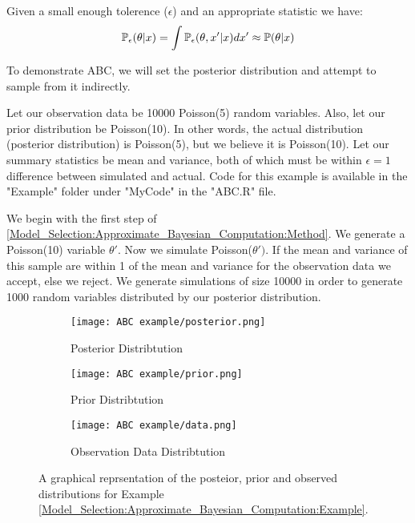 Given a small enough tolerence ($\epsilon$) and an appropriate statistic we have:
\begin{equation}
    \label{Model_Selection:Approximate_Bayesian_Computation:posterior_convergence}
    \mathbb{P}_{\epsilon}(\theta|x) = \int \mathbb{P}_{\epsilon}(\theta, x'|x)dx' \approx \mathbb{P}(\theta|x)
\end{equation}

\begin{example}
    \label{Model_Selection:Approximate_Bayesian_Computation:Example}
    To demonstrate ABC, we will set the posterior distribution and attempt to sample from it indirectly.

    Let our observation data be 10000 Poisson(5) random variables. Also, let our prior distribution be Poisson(10). In other words, the actual distribution (posterior distribution) is Poisson(5), but we believe it is Poisson(10). Let our summary statistics be mean and variance, both of which must be within $\epsilon =1$ difference between simulated and actual. Code for this example is available in the "Example" folder under "MyCode" in the "ABC.R" file.

    We begin with the first step of \ref{Model_Selection:Approximate_Bayesian_Computation:Method}. We generate a Poisson(10) variable $\theta'$. Now we simulate Poisson($\theta')$. If the mean and variance of this sample are within 1 of the mean and variance for the observation data we accept, else we reject. We generate simulations of size 10000 in order to generate 1000 random variables distributed by our posterior distribution. 

    \begin{figure}
        \centering
        \begin{subfigure}{.45\textwidth}
            \centering
            \texttt{[image: ABC example/posterior.png]}
            \caption{Posterior Distribtution}
            \label{Model_Selection:Approximate_Bayesian_Computation:Example_Figure:1}
        \end{subfigure}
        \begin{subfigure}{.45\textwidth}
            \centering
            \texttt{[image: ABC example/prior.png]}
            \caption{Prior Distribtution}
            \label{Model_Selection:Approximate_Bayesian_Computation:Example_Figure:2}
        \end{subfigure}    

        \begin{subfigure}{.45\textwidth}
            \centering
            \texttt{[image: ABC example/data.png]}
            \caption{Observation Data Distribtution }
            \label{Model_Selection:Approximate_Bayesian_Computation:Example_Figure:3}
        \end{subfigure}
        \caption{A graphical reprsentation of the posteior, prior and observed distributions for Example \ref{Model_Selection:Approximate_Bayesian_Computation:Example}.}
        \label{Model_Selection:Approximate_Bayesian_Computation:Example_Figure}
    \end{figure} 


\end{example}
